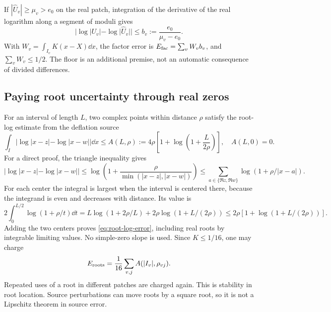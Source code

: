 If \(|\widehat U_v|\ge\mu_v>e_0\) on the real patch, integration of
the derivative of the real logarithm along a segment of moduli gives
\begin{equation}\label{eq:factor-log-error}
 |\log|U_v|-\log|\widehat U_v||\le b_v:=\frac{e_0}{\mu_v-e_0}.
\end{equation}
With \(W_v=\int_{I_v}K(x-X)\dd x\), the factor error is
\(E_{\rm fac}=\sum_vW_vb_v\), and \(\sum_vW_v\le1/2\).
The floor is an additional premise, not an automatic consequence of
divided differences.

\subsection{Paying root uncertainty through real zeros}
For an interval of length \(L\), two complex points within distance
\(\rho\) satisfy the root-log estimate from the deflation source
\cite[Section 3]{OGDeflation}
\begin{equation}\label{eq:root-log-error}
 \int_I|\log|x-z|-\log|x-w||\dd x
 \le A(L,\rho):=4\rho\left[1+\log\left(1+\frac{L}{2\rho}\right)\right],
 \quad A(L,0)=0.
\end{equation}
For a direct proof, the triangle inequality gives
\[
 |\log|x-z|-\log|x-w||
 \le\log\left(1+\frac{\rho}{\min(|x-z|,|x-w|)}\right)
 \le\sum_{a\in\{\Re z,\Re w\}}\log(1+\rho/|x-a|).
\]
For each center the integral is largest when the interval is centered
there, because the integrand is even and decreases with distance. Its
value is
\[
 2\int_0^{L/2}\log(1+\rho/t)\dd t
 =L\log(1+2\rho/L)+2\rho\log(1+L/(2\rho))
 \le2\rho[1+\log(1+L/(2\rho))].
\]
Adding the two centers proves \eqref{eq:root-log-error}, including real
roots by integrable limiting values. No simple-zero slope is used.
Since \(K\le1/16\), one may charge
\[
 E_{\rm roots}=\frac1{16}\sum_{v,j}A(|I_v|,\rho_{vj}).
\]
Repeated uses of a root in different patches are charged again.
This is stability in root location. Source perturbations can move
roots by a square root, so it is not a Lipschitz theorem in source error.

